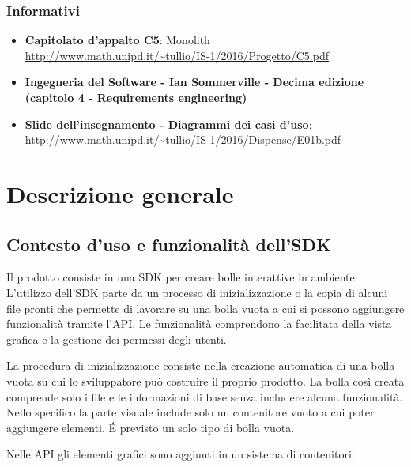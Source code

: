\subsubsection{Informativi}
\begin{itemize}
\item
  \textbf{Capitolato d'appalto C5}: Monolith \\
  \url{http://www.math.unipd.it/~tullio/IS-1/2016/Progetto/C5.pdf}
\item \textbf{Ingegneria del Software - Ian Sommerville - Decima edizione (capitolo 4 - Requirements engineering)}
\item \textbf{Slide dell’insegnamento - Diagrammi dei casi d’uso}:
  \\ \url{http://www.math.unipd.it/~tullio/IS-1/2016/Dispense/E01b.pdf}

\end{itemize}


\section{Descrizione generale}
\subsection{Contesto d'uso e funzionalità dell'SDK}

Il prodotto consiste in una SDK per creare bolle interattive
in ambiente .
L'utilizzo dell'SDK parte da un processo di inizializzazione 
o la copia di alcuni file pronti che permette di lavorare su
una bolla vuota a cui si possono aggiungere funzionalità tramite
l'API.
Le funzionalità comprendono la facilitata della vista
grafica e la gestione dei permessi degli utenti.

La procedura di inizializzazione consiste nella creazione automatica di una bolla
vuota su cui lo sviluppatore può costruire il proprio prodotto.
La bolla così creata comprende solo i file e le informazioni di base
senza includere alcuna funzionalità. Nello specifico la parte visuale include
solo un contenitore vuoto a cui poter aggiungere elementi.
\'E previsto un solo tipo di bolla vuota.



Nelle API gli elementi grafici sono aggiunti in un sistema di contenitori:

